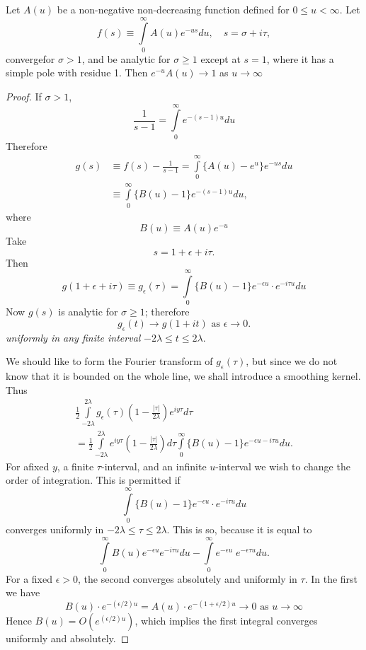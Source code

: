 \medskip
{}\cite[4]{key3}
Let $A(u)$ be a non-negative non-decreasing function defined for $0
\leq u < \infty$. Let 
$$
f(s) \equiv \int\limits^\infty_0 A(u) e^{-us} du, \quad s = \sigma + i
\tau,
$$
converge\pageoriginale for $\sigma >1$, and be analytic for $\sigma
\geq 1$ except at $s=1$, where it has a simple pole with residue
1. Then $e^{-u} A(u) \to 1$ as $u\to \infty$

\begin{proof}
If $\sigma >1$,
$$
\frac{1}{s-1} = \int\limits^\infty_0 e^{-(s-1)u} du
$$
Therefore
\begin{align*}
g(s) & \equiv f(s) - \frac{1}{s-1} = \int\limits^\infty_0 \{A(u)
-e^u\} e^{-us} du\\
& \equiv \int\limits^\infty_0 \{B(u)-1\} e^{-(s-1)u}du,
\end{align*}
where 
$$
B(u) \equiv A (u) e^{-u}
$$
Take 
$$
s = 1+\epsilon + i \tau .
$$
Then
$$
g(1+ \epsilon + i \tau) \equiv g_\epsilon (\tau) =
\int\limits^\infty_0 \{B(u) -1\} e^{-\epsilon u} \cdot e^{-i \tau
  u} du
$$
Now $g(s)$ is analytic for $\sigma \geq 1$; therefore
$$
g_\epsilon (t) \to g(1+it) \text{ as } \epsilon \to 0.
$$
\textit{uniformly in any finite interval} $-2\lambda \leq t \leq 2
\lambda$. 

We should like to form the Fourier transform of $g_\epsilon
(\tau)$, but since we do not know that it is  bounded on the whole
line, we shall introduce a smoothing kernel. Thus 
\begin{multline*}
\frac{1}{2}\int\limits^{2\lambda}_{-2\lambda} g_\epsilon (\tau)
\left(1-\frac{|\tau|}{2\lambda} \right) e^{iy\tau} d\tau \\
= \frac{1}{2} \int\limits^{2\lambda}_{-2\lambda} e^{iy\tau}
\left(1-\frac{|\tau|}{2\lambda} \right)  d\tau \int\limits^\infty_0
\{B(u)-1\} e^{-\epsilon u - i \tau u} du.
\end{multline*}
For a\pageoriginale fixed $y$, a finite $\tau$-interval, and an
infinite $u$-interval we wish to change the order of integration. This
is permitted if 
$$
\int\limits^\infty_0 \{B(u)-1\} e^{-\epsilon u} \cdot e^{-i \tau u}
du 
$$
converges uniformly in $-2\lambda \leq \tau \leq 2\lambda$. This is
so, because it is equal to 
$$ 
\int\limits^\infty_0 B(u) e^{-\epsilon u} e^{-i \tau u} du -
\int\limits^\infty_0 e^{-\epsilon u} \; e^{-\epsilon \tau u} du.
$$
For a fixed $\epsilon >0$, the second converges absolutely and
uniformly in $\tau$. In the first we have
$$
B(u) \cdot e^{-(\epsilon /2)u} = A(u) \cdot e^{-(1+\epsilon/2)u}
\to 0 \text{ as } u \to \infty
$$
Hence $B(u) = O (e^{(\epsilon/2) u})$, which implies the first integral converges
uniformly and absolutely. 


\end{proof}
